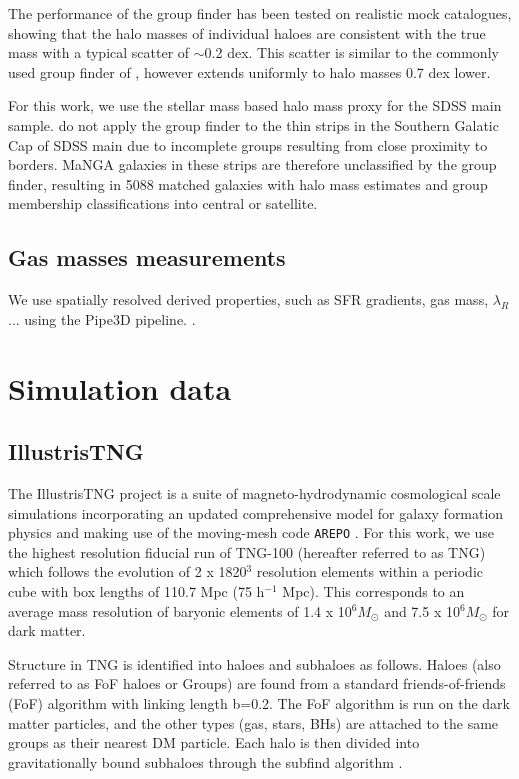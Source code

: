 \documentclass[fleqn,usenatbib]{mnras}
\begin{document}
The performance of the group finder has been tested on realistic mock catalogues, showing that the halo masses of individual haloes are consistent with the true mass with a typical scatter of $\sim$0.2 dex. This scatter is similar to the commonly used group finder of \citet{yang2007}, however extends uniformly to halo masses 0.7 dex lower. 

For this work, we use the stellar mass based halo mass proxy for the SDSS main sample. \citet{lim2017} do not apply the group finder to the thin strips in the Southern Galatic Cap of SDSS main due to incomplete groups resulting from close proximity to borders. MaNGA galaxies in these strips are therefore unclassified by the group finder, resulting in 5088 matched galaxies with halo mass estimates and group membership classifications into central or satellite.

\subsection{Gas masses measurements}
We use spatially resolved derived properties, such as SFR gradients, gas mass, $\lambda_{R}$... using the Pipe3D pipeline. \citep{pipe3Da,pipe3Dvac}.

\section{Simulation data} \label{sec:sim_data}
\subsection{IllustrisTNG}
The IllustrisTNG project \citep{marinacci18,naiman18,nelson18,pillepich18b,springel18} is a suite of magneto-hydrodynamic cosmological scale simulations incorporating an updated comprehensive model for galaxy formation physics \citep[as decribed in; ][]{weinberger17,pillepich18a} and making use of the moving-mesh code \texttt{AREPO} \citep{springel10,pakmor11,pakmor13}. For this work, we use the highest resolution fiducial run of TNG-100 (hereafter referred to as TNG) which follows the evolution of 2 x 1820$^3$ resolution elements within a periodic cube with box lengths of 110.7 Mpc (75 h$^{-1}$ Mpc). This corresponds to an average mass resolution of baryonic elements of 1.4 x 10$^6 M_{\odot}$ and 7.5 x 10$^6 M_{\odot}$ for dark matter. 

Structure in TNG is identified into haloes and subhaloes as follows. Haloes (also referred to as FoF haloes or Groups) are found from a standard friends-of-friends (FoF) algorithm \citep{davis85} with linking length b=0.2. The FoF algorithm is run on the dark matter particles, and the other types (gas, stars, BHs) are attached to the same groups as their nearest DM particle. Each halo is then divided into gravitationally bound subhaloes through the subfind algorithm \citep{springel01}.
\end{document}
